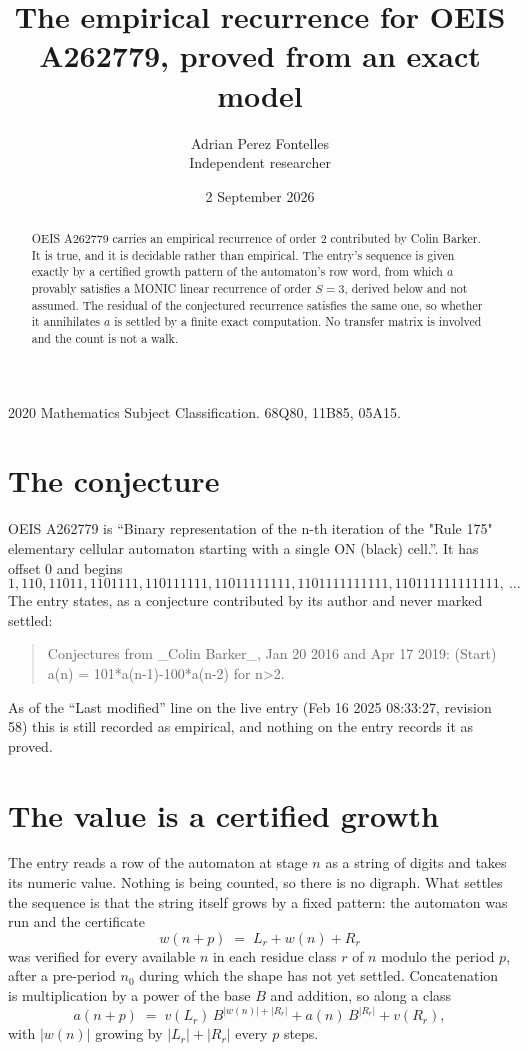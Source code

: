 \documentclass[11pt,a4paper]{article}
\title{The empirical recurrence for OEIS A262779, proved from an exact model}
\author{Adrian Perez Fontelles\\ \small Independent researcher}
\date{2 September 2026}
\theoremstyle{plain}
\theoremstyle{definition}
\begin{document}
\maketitle

\begin{abstract}
OEIS A262779 carries an empirical recurrence of order $2$ contributed by Colin Barker. It is true, and it is
decidable rather than empirical. The entry's sequence is given exactly by a certified growth pattern of the automaton's row word, from
which $a$ provably satisfies a MONIC linear recurrence of order $S=3$, derived below and not
assumed. The residual of the conjectured recurrence satisfies the same one, so whether it
annihilates $a$ is settled by a finite exact computation. No transfer matrix is involved and
the count is not a walk.
\end{abstract}

\noindent\small 2020 Mathematics Subject Classification. 68Q80, 11B85, 05A15.\normalsize

\section{The conjecture}

OEIS A262779 is ``Binary representation of the n-th iteration of the "Rule 175" elementary cellular automaton starting with a single ON (black) cell.''. It has offset $0$ and begins
\[
1, 110, 11011, 1101111, 110111111, 11011111111, 1101111111111, 110111111111111,\ \dots
\]
The entry states, as a conjecture contributed by its author and never marked settled:
\begin{quote}
Conjectures from \_Colin Barker\_, Jan 20 2016 and Apr 17 2019: (Start) a(n) = 101*a(n-1)-100*a(n-2) for n>2.
\end{quote}
As of the ``Last modified'' line on the live entry (Feb 16 2025 08:33:27, revision 58)
this is still recorded as empirical, and nothing on the entry records it as proved.

\section{The value is a certified growth}

The entry reads a row of the automaton at stage $n$ as a string of digits and takes its
numeric value. Nothing is being counted, so there is no digraph. What settles the sequence is
that the string itself grows by a fixed pattern: the automaton was run and the certificate
\[
w(n+p)\;=\;L_r + w(n) + R_r
\]
was verified for every available $n$ in each residue class $r$ of $n$ modulo the period $p$,
after a pre-period $n_0$ during which the shape has not yet settled. Concatenation is
multiplication by a power of the base $B$ and addition, so along a class
\[
a(n+p)\;=\;v(L_r)\,B^{|w(n)|+|R_r|} + a(n)\,B^{|R_r|} + v(R_r),
\]
with $|w(n)|$ growing by $|L_r|+|R_r|$ every $p$ steps.
\end{document}
